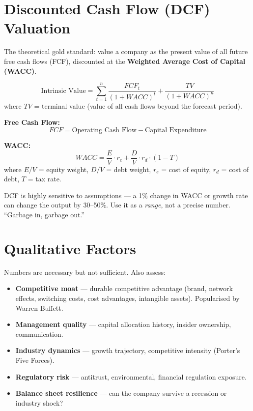 \section{Discounted Cash Flow (DCF) Valuation}

The theoretical gold standard: value a company as the present value of all future free
cash flows (FCF), discounted at the \textbf{Weighted Average Cost of Capital (WACC)}.

\begin{formulabox}
\[
  \text{Intrinsic Value} = \sum_{t=1}^{n} \frac{FCF_t}{(1 + WACC)^t} + \frac{TV}{(1 + WACC)^n}
\]
where $TV$ = terminal value (value of all cash flows beyond the forecast period).

\textbf{Free Cash Flow:}
\[
  FCF = \text{Operating Cash Flow} - \text{Capital Expenditure}
\]

\textbf{WACC:}
\[
  WACC = \frac{E}{V} \cdot r_e + \frac{D}{V} \cdot r_d \cdot (1 - T)
\]
where $E/V$ = equity weight, $D/V$ = debt weight, $r_e$ = cost of equity,
$r_d$ = cost of debt, $T$ = tax rate.
\end{formulabox}

\begin{notebox}
DCF is highly sensitive to assumptions — a 1\% change in WACC or growth rate can
change the output by 30--50\%. Use it as a \emph{range}, not a precise number.
``Garbage in, garbage out.''
\end{notebox}

\section{Qualitative Factors}

Numbers are necessary but not sufficient. Also assess:

\begin{itemize}
  \item \textbf{Competitive moat} — durable competitive advantage (brand, network effects,
        switching costs, cost advantages, intangible assets). Popularised by Warren Buffett.
  \item \textbf{Management quality} — capital allocation history, insider ownership, communication.
  \item \textbf{Industry dynamics} — growth trajectory, competitive intensity (Porter's Five Forces).
  \item \textbf{Regulatory risk} — antitrust, environmental, financial regulation exposure.
  \item \textbf{Balance sheet resilience} — can the company survive a recession or industry shock?
\end{itemize}

